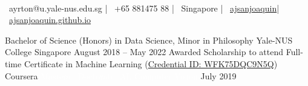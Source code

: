 \documentclass[]{awesome-cv}
\begin{document}
    
\begin{center}
	 \  \\
	{\faEnvelope\ ayrton@u.yale-nus.edu.sg} | {\faMobile\ +65 881475 88} | {\faMapMarker\ Singapore} | {\faLinkedinSquare\ \href{https://www.linkedin.com/in/ajsanjoaquin/}{ajsanjoaquin}}| {\faLink\ \href{http://ajsanjoaquin.github.io/}{ajsanjoaquin.github.io}}
\end{center}
\begin{cventries}
	\cventry
	{Bachelor of Science (Honors) in Data Science, Minor in Philosophy}
	{Yale-NUS College}
	{Singapore}
	{August 2018 – May 2022}
	{Awarded Scholarship to attend Full-time}
	\cventry
	{Certificate in Machine Learning (\href{https://www.coursera.org/account/accomplishments/verify/WFK75DQC9N5Q}{Credential ID: WFK75DQC9N5Q})}
	{Coursera
	\textcolor{white}{Masters , Doctorate, AI, Computer Vision}}
	{}
	{July 2019}
	{}
\end{cventries}
\vspace{-8mm}
\end{document}
